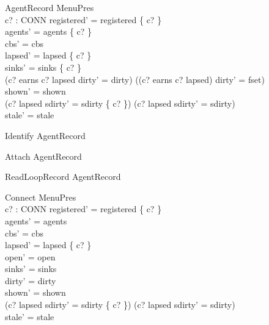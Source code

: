 \documentclass[a4paper,10pt,fleqn]{article}
\begin{document}
\begin{schema}{AgentRecord}
  \Delta MenuPres \\
  c? : CONN
\where
  registered' = registered \cup \{ c? \} \\
  agents' = agents \cup \{ c? \} \\
  cbs' = cbs \\
  lapsed' = lapsed \setminus \{ c? \} \\
  sinks' = sinks \oplus \{ c?  \} \\
  (c? \in earns \land c? \notin lapsed \land dirty' = dirty) \lor
    ((c? \notin earns \lor c? \in lapsed) \land dirty' = fset) \\
  shown' = shown \\
  (c? \in lapsed \land sdirty' = sdirty \cup \{ c? \}) \lor
    (c? \notin lapsed \land sdirty' = sdirty) \\
  stale' = stale
\end{schema}

\begin{zed}
  Identify  AgentRecord \land [\Delta MenuPres | open' = open]
\end{zed}

\begin{zed}
  Attach  AgentRecord \land [\Delta MenuPres; c? : CONN | open' = open \cup \{ c? \}]
\end{zed}

\begin{zed}
  ReadLoopRecord  AgentRecord \land
    [\Delta MenuPres; c? : CONN | open' = open \land c? \in open]
\end{zed}

\begin{schema}{Connect}
  \Delta MenuPres \\
  c? : CONN
\where
  registered' = registered \cup \{ c? \} \\
  agents' = agents \\
  cbs' = cbs \\
  lapsed' = lapsed \setminus \{ c? \} \\
  open' = open \\
  sinks' = sinks \\
  dirty' = dirty \\
  shown' = shown \\
  (c? \in lapsed \land sdirty' = sdirty \cup \{ c? \}) \lor
    (c? \notin lapsed \land sdirty' = sdirty) \\
  stale' = stale
\end{schema}
\end{document}
